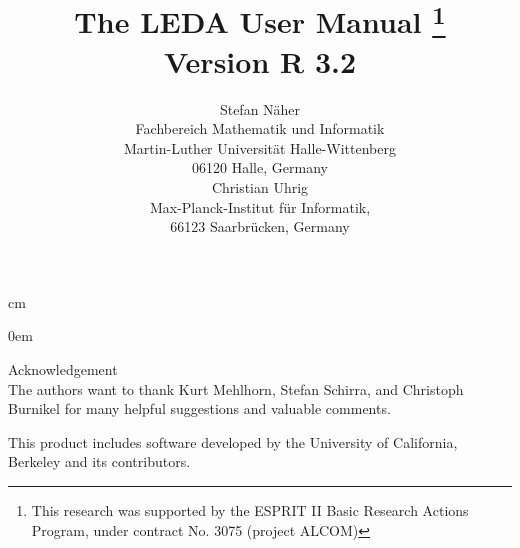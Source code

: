 \textwidth 15.4cm 
 cm
\topmargin -14mm       
\evensidemargin 3mm 
\oddsidemargin 3mm



\parindent0em
\setlength{\parskip}{1ex minus 0.9ex}
\setcounter{chapter}{-1}

\sloppy

\title {The LEDA User Manual
        \thanks{This research was supported by the ESPRIT II Basic Research 
                Actions Program, under contract No. 3075 (project ALCOM)}\\
        \vspace{5mm}
        Version R 3.2}
\author{ Stefan N\"aher\\
        {\footnotesize  Fachbereich Mathematik und Informatik}\\[-0.7ex]
        {\footnotesize  Martin-Luther Universit\"at Halle-Wittenberg}\\[-0.7ex]
        {\footnotesize 06120 Halle, Germany}\\[1cm]
         Christian Uhrig\\
        {\footnotesize  Max-Planck-Institut f\"ur Informatik,}\\[-0.7ex]
        {\footnotesize 66123 Saarbr\"ucken, Germany}\\[-0.7ex]}

\date{}



 
\maketitle





\tableofcontents

\vspace*{2cm}
{\large  Acknowledgement}\\
The authors want to thank Kurt Mehlhorn, Stefan Schirra,
and Christoph Burnikel for many helpful suggestions and valuable comments.

\vspace*{1cm}
This product includes software developed by the University of
California, Berkeley and its contributors.

\newpage

\vspace*{5cm}




















